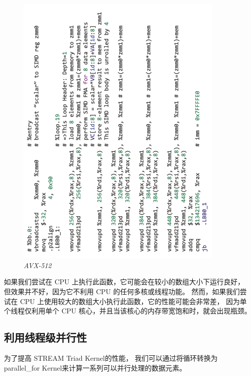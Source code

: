 \begin{figure}[H]
	\centering
	\includegraphics[width=0.9\textwidth]{figs/F16.5.png}
	\caption{\textit{AVX-512 }}
\end{figure}

如果我们尝试在 CPU 上执行此函数，它可能会在较小的数组大小下运行良好，
但效果并不好，因为它不利用 CPU 的任何多核或线程功能。 
然而，如果我们尝试在 CPU 上使用较大的数组大小执行此函数，它的性能可能会非常差，
因为单个线程仅利用单个 CPU 核心，并且当该核心的内存带宽饱和时，就会出现瓶颈。

\subsection{利用线程级并行性}
为了提高 STREAM Triad Kernel的性能，
我们可以通过将循环转换为 parallel\_for Kernel来计算一系列可以并行处理的数据元素。

